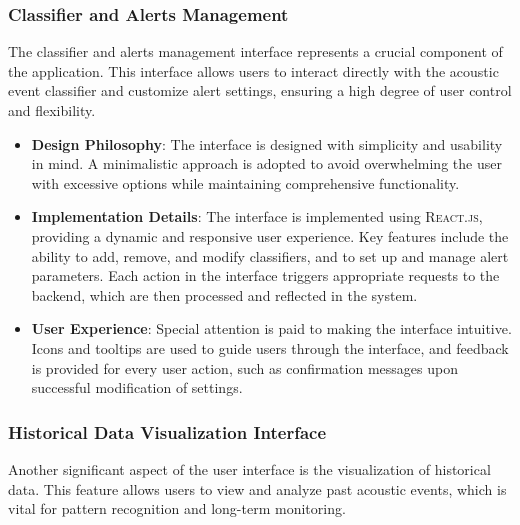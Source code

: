 \subsubsection{Classifier and Alerts Management}
The classifier and alerts management interface represents a crucial component of the application. This interface allows users to interact directly with the acoustic event classifier and customize alert settings, ensuring a high degree of user control and flexibility.
\begin{itemize}
  \item \textbf{Design Philosophy}: The interface is designed with simplicity and usability in mind. A minimalistic approach is adopted to avoid overwhelming the user with excessive options while maintaining comprehensive functionality.
  \item \textbf{Implementation Details}: The interface is implemented using \textsc{React.js}, providing a dynamic and responsive user experience. Key features include the ability to add, remove, and modify classifiers, and to set up and manage alert parameters. Each action in the interface triggers appropriate requests to the backend, which are then processed and reflected in the system.
  \item \textbf{User Experience}: Special attention is paid to making the interface intuitive. Icons and tooltips are used to guide users through the interface, and feedback is provided for every user action, such as confirmation messages upon successful modification of settings.
\end{itemize}

\subsubsection{Historical Data Visualization Interface}
Another significant aspect of the user interface is the visualization of historical data. This feature allows users to view and analyze past acoustic events, which is vital for pattern recognition and long-term monitoring.


